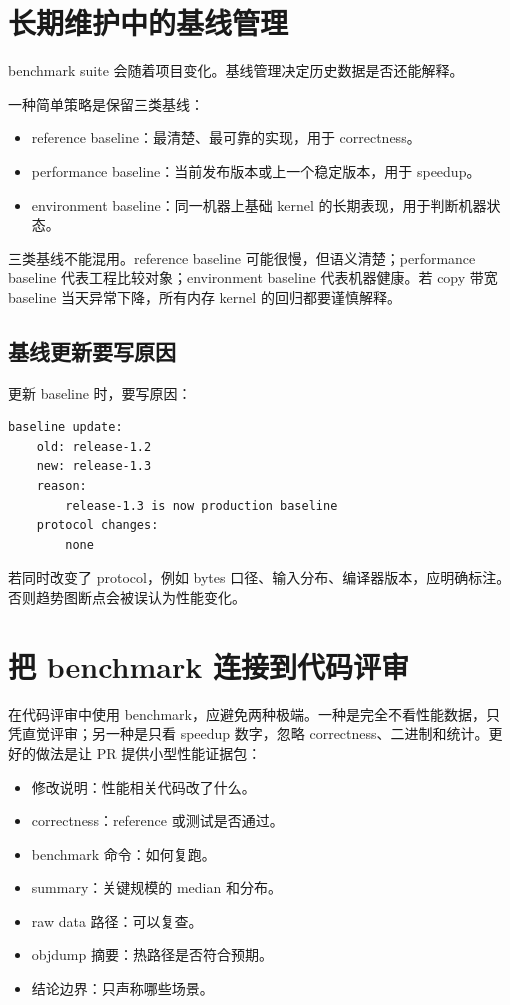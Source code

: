 \section{长期维护中的基线管理}

benchmark suite 会随着项目变化。基线管理决定历史数据是否还能解释。

一种简单策略是保留三类基线：

\begin{itemize}
  \item reference baseline：最清楚、最可靠的实现，用于 correctness。
  \item performance baseline：当前发布版本或上一个稳定版本，用于 speedup。
  \item environment baseline：同一机器上基础 kernel 的长期表现，用于判断机器状态。
\end{itemize}

三类基线不能混用。reference baseline 可能很慢，但语义清楚；performance baseline 代表工程比较对象；environment baseline 代表机器健康。若 copy 带宽 baseline 当天异常下降，所有内存 kernel 的回归都要谨慎解释。

\subsection{基线更新要写原因}

更新 baseline 时，要写原因：

\begin{lstlisting}
baseline update:
    old: release-1.2
    new: release-1.3
    reason:
        release-1.3 is now production baseline
    protocol changes:
        none
\end{lstlisting}

若同时改变了 protocol，例如 bytes 口径、输入分布、编译器版本，应明确标注。否则趋势图断点会被误认为性能变化。

\section{把 benchmark 连接到代码评审}

在代码评审中使用 benchmark，应避免两种极端。一种是完全不看性能数据，只凭直觉评审；另一种是只看 speedup 数字，忽略 correctness、二进制和统计。更好的做法是让 PR 提供小型性能证据包：

\begin{itemize}
  \item 修改说明：性能相关代码改了什么。
  \item correctness：reference 或测试是否通过。
  \item benchmark 命令：如何复跑。
  \item summary：关键规模的 median 和分布。
  \item raw data 路径：可以复查。
  \item objdump 摘要：热路径是否符合预期。
  \item 结论边界：只声称哪些场景。
\end{itemize}


